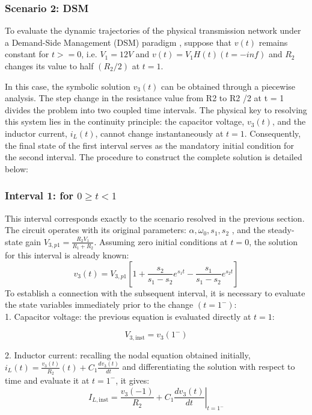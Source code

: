 \documentclass[energies,accept,oneauthor,pdftex]{Definitions/mdpi}
\begin{document}
\subsubsection*{Scenario 2: DSM}

To evaluate the dynamic trajectories of the physical transmission network under a Demand-Side Management (DSM) paradigm \cite{Kundur1994power}, suppose that $v(t)$ remains constant for $t>=0$, i.e. $V_1 = 12 V$ and $v(t) = V_1 H(t) (t = - inf)$ and
$R_2$ changes its value to half $(R_2 /2)$ at $t = 1$.


In this case, the symbolic solution $v_3 (t)$ can be obtained through a piecewise analysis.
The step change in the resistance value from R2 to R2 /2 at t = 1 divides the problem into two coupled time intervals. The physical key to resolving this system lies in the continuity principle: the capacitor voltage, $v_3 (t)$, and the inductor current, $i_L (t)$, cannot change instantaneously at $t = 1$. Consequently, the final state of the first interval serves
as the mandatory initial condition for the second interval. The procedure to construct the complete solution is detailed below:

\subsubsection*{Interval 1: for $0 \ge t < 1$}

This interval corresponds exactly to the scenario resolved in the previous section. The circuit operates with its original parameters: $\alpha, \omega_0 , s_1 , s_2$ , and the steady-state gain $V_{3,p1} = \frac{R_2 V_1}{R_1+R_2}$. Assuming zero initial conditions at $t = 0$, the solution for this interval is already known:
\[
v_3 (t) =V_{3,p1}
\left[1+\frac{s_2}{s_1-s_2}e^{s_1t}  -\frac{ s_1}{s_1-s_2}e^{s_2t} \right]
\]
To establish a connection with the subsequent interval, it is necessary to evaluate the state variables immediately prior to the change $(t =1^-)$:\\

1. Capacitor voltage: the previous equation is evaluated directly at $t = 1$:

\[
V_{3,\mathrm{inst}} = v_3 (1^-)
\]

2. Inductor current: recalling the nodal equation obtained initially,
$i_{L} (t) = \frac{v_3(t)}{R_2} (t) + C_1 \frac{dv_3(t)}{dt}$ and differentiating the solution with respect to time and evaluate it at $t = 1^-$, it gives:
\[
I_{L,\mathrm{inst}} =\frac{v_3(-1)}{R_2}+ C_1
   \left.\frac{dv_3(t)}{dt}\right|_{t=1^-}
\]
\end{document}
